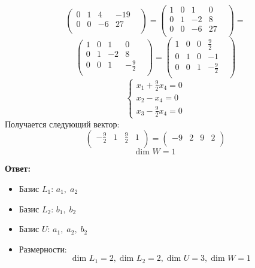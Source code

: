 \documentclass[a4paper,12pt]{article}
\begin{document}
\begin{itemize}
\begin{enumerate}
\[\begin{pmatrix}
0 & 1 & 4 & -19 & \\
0 & 0 & -6 & 27 & \\
\end{pmatrix}
=
\begin{pmatrix}
1 & 0 & 1 & 0 & \\
0 & 1 & -2 & 8 & \\
0 & 0 & -6 & 27 & \\
\end{pmatrix} 
=
\]
\[
\begin{pmatrix}
1 & 0 & 1 & 0 & \\
0 & 1 & -2 & 8 & \\
0 & 0 & 1 & -\frac{9}{2} & \\
\end{pmatrix}
=
\begin{pmatrix}
1 & 0 &  0& \frac{9}{2}& \\
0 & 1 & 0& -1 & \\
0 & 0 & 1 & -\frac{9}{2} & \\
\end{pmatrix}
\]
\[
\begin{cases}
x_1 + \frac{9}{2}x_4 = 0 \\
x_2 - x_4 = 0 \\
x_3 - \frac{9}{2}x_4 = 0
\end{cases}
\]
Получается следующий вектор:
\[
\begin{pmatrix}
-\frac{9}{2} & 1 & \frac{9}{2} & 1\\
\end{pmatrix}
=
\begin{pmatrix}
-9& 2 & 9 & 2\\
\end{pmatrix}
\]
\[
\text{dim } W = 1
\]
\end{enumerate}
 \end{itemize} 
{\large \begin{center}
\textbf{Ответ:} 
\begin{itemize}
\item
Базис $L_1$: $a_1, \; a_2$
\item
Базис $L_2$: $b_1, \; b_2$
\item
Базис $U$: $a_1, \; a_2, \; b_2$
\item
Размерности:
\[
\text{dim } L_1 = 2,\;
\text{dim } L_2 = 2,\;
\text{dim } U = 3,\;
\text{dim } W = 1\;
\]
\end{itemize}
\end{center}}
\end{document}
